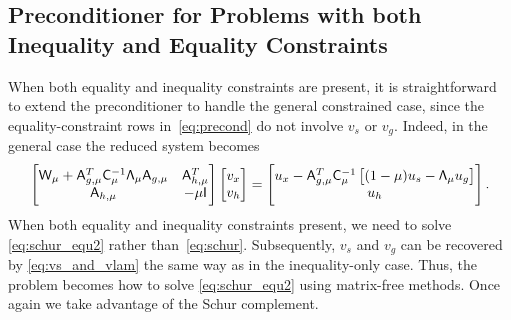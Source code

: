 \subsection{Preconditioner for Problems with both Inequality and Equality Constraints}
When both equality and inequality constraints are present, it is straightforward 
to extend the preconditioner to handle the general 
constrained case, since the 
equality-constraint rows in~\eqref{eq:precond} do not involve $v_s$ or $v_g$.
Indeed, in the general case the reduced system becomes
\begin{equation}\label{eq:schur_equ2}
\begin{bmatrix}
\mathsf{W}_\mu +  \mathsf{A}_{g,\mu}^T  \mathsf{C}_\mu^{-1} \mathsf{\Lambda}_\mu    \mathsf{A}_{g,\mu}    & \mathsf{A}_{h,\mu}^T   \\
\mathsf{A}_{h,\mu}  & -\mu \mathsf{I}
\end{bmatrix}
\begin{bmatrix} v_x \\ v_h  \end{bmatrix} 
=
\begin{bmatrix} u_x - \mathsf{A}_{g,\mu}^T \mathsf{C}_\mu^{-1}  \left[(1-\mu) u_s  - \mathsf{\Lambda}_\mu u_g     \right]  \\ u_h  \end{bmatrix}. 
\end{equation}
When both equality and inequality constraints present, we need to solve \eqref{eq:schur_equ2} rather than~\eqref{eq:schur}. Subsequently,  $v_s$ and $v_g$ can be recovered by \eqref{eq:vs_and_vlam} the same way as in the inequality-only case. Thus, the problem becomes how to solve \eqref{eq:schur_equ2} 
 using matrix-free methods. Once again we take advantage of the Schur complement. 

